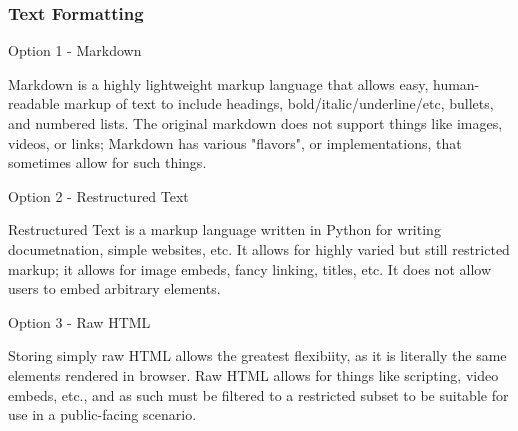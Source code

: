 \documentclass[letterpaper, 10pt, draftclsnofoot, compsoc, onecolumn]{IEEEtran}
\begin{document}
{\subsubsection{Text Formatting}
{\noindent \par}
{\noindent Option 1 - Markdown \par}
{\noindent Markdown is a highly lightweight markup language that allows easy, human-readable markup
of text to include headings, bold/italic/underline/etc, bullets, and numbered lists. The original markdown does not support
things like images, videos, or links; Markdown has various "flavors", or implementations, that sometimes
allow for such things. \par}
{\noindent Option 2 - Restructured Text \par}
{\noindent Restructured Text is a markup language written in Python for writing documetnation, simple websites,
etc. It allows for highly varied but still restricted markup; it allows for image embeds, fancy linking,
titles, etc. It does not allow users to embed arbitrary elements. \par}
{\noindent Option 3 - Raw HTML \par}
{\noindent Storing simply raw HTML allows the greatest flexibiity, as it is literally the same elements
rendered in browser. Raw HTML allows for things like scripting, video embeds, etc., and as such must
be filtered to a restricted subset to be suitable for use in a public-facing scenario. \par}

\medskip
}
\end{document}
